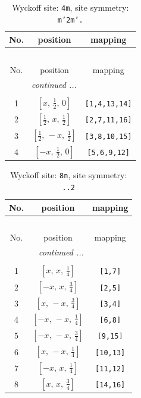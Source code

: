 \documentclass[fleqn,8pt]{jsarticle}
\begin{document}
\renewcommand{\arraystretch}{1.2}
\begin{longtable}{ccc}
\caption{Wyckoff site: {\tt 4m}, site symmetry: {\tt m'2m'.}}
 \\
 \hline \hline
No. & position & mapping \\ \hline \endfirsthead

\multicolumn{2}{l}{\tablename\ \thetable{}} \\
 \hline \hline
No. & position & mapping \\ \hline \endhead

 \hline \hline
\multicolumn{2}{r}{\footnotesize\it continued ...} \\ \endfoot

 \hline \hline
\multicolumn{2}{r}{} \\ \endlastfoot

1 & $\left[ x,\, \frac{1}{2},\, 0 \right]$ & {\tt [1,4,13,14]} \\ \hline
2 & $\left[ \frac{1}{2},\, x,\, \frac{1}{2} \right]$ & {\tt [2,7,11,16]} \\ \hline
3 & $\left[ \frac{1}{2},\, - x,\, \frac{1}{2} \right]$ & {\tt [3,8,10,15]} \\ \hline
4 & $\left[ - x,\, \frac{1}{2},\, 0 \right]$ & {\tt [5,6,9,12]} \\
\end{longtable}
\renewcommand{\arraystretch}{1.2}
\begin{longtable}{ccc}
\caption{Wyckoff site: {\tt 8n}, site symmetry: {\tt ..2}}
 \\
 \hline \hline
No. & position & mapping \\ \hline \endfirsthead

\multicolumn{2}{l}{\tablename\ \thetable{}} \\
 \hline \hline
No. & position & mapping \\ \hline \endhead

 \hline \hline
\multicolumn{2}{r}{\footnotesize\it continued ...} \\ \endfoot

 \hline \hline
\multicolumn{2}{r}{} \\ \endlastfoot

1 & $\left[ x,\, x,\, \frac{1}{4} \right]$ & {\tt [1,7]} \\ \hline
2 & $\left[ - x,\, x,\, \frac{3}{4} \right]$ & {\tt [2,5]} \\ \hline
3 & $\left[ x,\, - x,\, \frac{3}{4} \right]$ & {\tt [3,4]} \\ \hline
4 & $\left[ - x,\, - x,\, \frac{1}{4} \right]$ & {\tt [6,8]} \\ \hline
5 & $\left[ - x,\, - x,\, \frac{3}{4} \right]$ & {\tt [9,15]} \\ \hline
6 & $\left[ x,\, - x,\, \frac{1}{4} \right]$ & {\tt [10,13]} \\ \hline
7 & $\left[ - x,\, x,\, \frac{1}{4} \right]$ & {\tt [11,12]} \\ \hline
8 & $\left[ x,\, x,\, \frac{3}{4} \right]$ & {\tt [14,16]} \\
\end{longtable}
\end{document}
